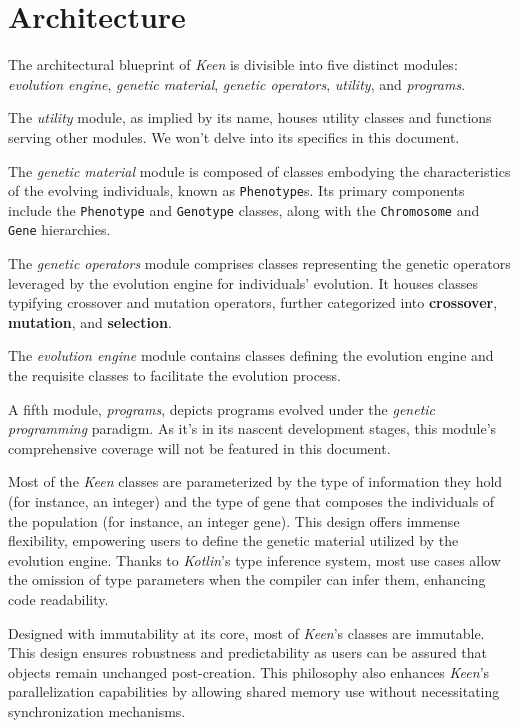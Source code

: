 \section{Architecture}
\label{sec:architecture}
  The architectural blueprint of \textit{Keen} is divisible into five distinct
  modules: \textit{evolution engine}, \textit{genetic material}, 
  \textit{genetic operators}, \textit{utility}, and \textit{programs}.

  The \emph{utility} module, as implied by its name, houses utility classes and 
  functions serving other modules.
  We won't delve into its specifics in this document.

  The \emph{genetic material} module is composed of classes embodying the 
  characteristics of the evolving individuals, known as \texttt{Phenotype}s.
  Its primary components include the \texttt{Phenotype} and \texttt{Genotype} 
  classes, along with the \texttt{Chromosome} and \texttt{Gene} hierarchies.

  The \emph{genetic operators} module comprises classes representing the 
  genetic operators leveraged by the evolution engine for individuals' 
  evolution.
  It houses classes typifying crossover and mutation operators, further 
  categorized into \textbf{crossover}, \textbf{mutation}, and 
  \textbf{selection}.

  The \emph{evolution engine} module contains classes defining the evolution 
  engine and the requisite classes to facilitate the evolution process.

  A fifth module, \emph{programs}, depicts programs evolved under the 
  \textit{genetic programming} paradigm.
  As it's in its nascent development stages, this module's comprehensive 
  coverage will not be featured in this document.

  Most of the \textit{Keen} classes are parameterized by the type of 
  information they hold (for instance, an integer) and the type of gene that 
  composes the individuals of the population (for instance, an integer gene).
  This design offers immense flexibility, empowering users to define the 
  genetic material utilized by the evolution engine.
  Thanks to \textit{Kotlin}'s type inference system, most use cases allow the 
  omission of type parameters when the compiler can infer them, enhancing code 
  readability.

  Designed with immutability at its core, most of \textit{Keen}'s classes are 
  immutable.
  This design ensures robustness and predictability as users can be assured 
  that objects remain unchanged post-creation.
  This philosophy also enhances \textit{Keen}'s parallelization capabilities by 
  allowing shared memory use without necessitating synchronization mechanisms.


